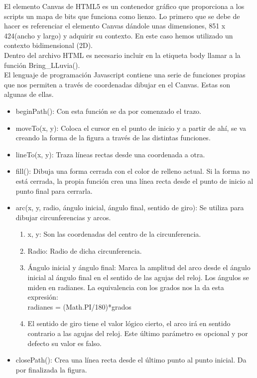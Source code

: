 El elemento Canvas  de HTML5 es un contenedor gráfico que  proporciona a los scripts  un mapa de bits  que funciona como lienzo.
Lo primero que se debe de hacer es referenciar el elemento Canvas dándole unas dimensiones, 851 x 424(ancho y largo) y adquirir su contexto.
En este caso hemos utilizado un contexto bidimensional (2D).\\

Dentro del archivo HTML es necesario incluir en la 
etiqueta body llamar a la función Bring\_LLuvia().\\

El lenguaje de programación Javascript contiene una serie de funciones propias que nos permiten  a través de coordenadas dibujar en el Canvas.
Estas son algunas de ellas.

\begin{itemize}
 \item beginPath():  Con esta función se da por comenzado el trazo.
 \item moveTo(x, y): Coloca el cursor en el punto de inicio y a partir de ahí, se va creando la forma de la figura a través de las distintas 
 funciones.
 \item lineTo(x, y): Traza líneas rectas desde una coordenada a otra.
 \item fill(): Dibuja una forma cerrada con el color de relleno actual. Si la forma no está cerrada, la propia función crea una línea recta 
 desde el punto de inicio  al punto final para cerrarla.
 \item arc(x, y, radio, ángulo inicial, ángulo final, sentido de giro):  Se utiliza para dibujar circunferencias y arcos.
 \begin{enumerate}
 \item x, y: Son las coordenadas del centro de la circunferencia.
 \item Radio: Radio de dicha circunferencia.
 \item Ángulo inicial y ángulo final: Marca la amplitud del arco desde el ángulo inicial al ángulo final en el sentido de las agujas del reloj. Los ángulos se miden en radianes. 
 La equivalencia con los grados nos la da esta expresión:\\
 radianes = (Math.PI/180)*grados
 \item El sentido de giro tiene el valor lógico cierto, el arco irá en sentido contrario a las agujas del reloj. Este último parámetro es 
 opcional y por defecto su valor es falso.
 \end{enumerate}
 \item closePath(): Crea una línea recta desde el último punto al punto inicial. Da por finalizada la figura.
\end{itemize}

